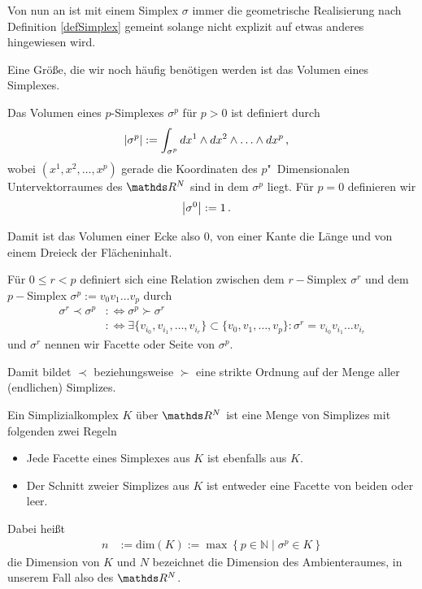     Von nun an ist mit einem Simplex \( \sigma \) immer die geometrische Realisierung nach Definition \ref{defSimplex} gemeint solange nicht explizit auf
    etwas anderes hingewiesen wird.
    
    Eine Größe, die wir noch häufig benötigen werden ist das Volumen eines Simplexes.
    \begin{definition}
      Das Volumen eines \( p \)-Simplexes \( \sigma^{p} \) für \( p > 0 \) ist definiert durch
      \begin{align}
        \left| \sigma^{p} \right| &:= \int_{\sigma^{p}} dx^{1}\wedge dx^{2} \wedge \ldots \wedge dx^{p}\,\text{,}
      \end{align}
      wobei \( \left( x^{1}, x^{2}, \ldots, x^{p} \right) \) gerade die Koordinaten des \( p \)"~Dimensionalen Untervektorraumes des
      \( \R^{N} \) sind in dem \( \sigma^{p} \) liegt.
      Für \( p=0  \) definieren wir
      \begin{align}
        \left| \sigma^{0} \right| &:= 1 \,\text{.}
      \end{align}
    \end{definition}
    Damit ist das Volumen einer Ecke also 0, von einer Kante die Länge und von einem Dreieck der Flächeninhalt.


    \begin{definition}
      Für \( 0 \le r < p \) definiert sich eine Relation zwischen dem \( r- \)Simplex \(\sigma^{r}\) und dem \( p- \)Simplex \( \sigma^{p}:= v_{0} v_{1} \ldots v_{p} \) durch
      \begin{align}
        \sigma^{r} \prec \sigma^{p} &:\Leftrightarrow \sigma^{p} \succ \sigma^{r} \\
                                    &:\Leftrightarrow \exists \{ v_{i_{0}}, v_{i_{1}}, \ldots, v_{i_{r}} \} \subset \{ v_{0}, v_{1}, \ldots, v_{p}\} : \sigma^{r} = v_{i_{0}} v_{i_{1}} \ldots v_{i_{r}}
      \end{align}
      und \( \sigma^{r} \) nennen wir Facette oder Seite von \( \sigma^{p} \).
    \end{definition}
    
    Damit bildet \( \prec \) beziehungsweise \( \succ \) eine strikte Ordnung auf der Menge aller (endlichen) Simplizes.
    
    \begin{definition}
      Ein Simplizialkomplex \( K \) über \( \R^{N} \) ist eine Menge von Simplizes mit folgenden zwei Regeln
      \begin{itemize}
        \item Jede Facette eines Simplexes aus \( K \) ist ebenfalls aus \( K \).
        \item Der Schnitt zweier Simplizes aus \( K \) ist entweder eine Facette von beiden oder leer.
      \end{itemize}
      Dabei heißt
      \begin{align}
        n &:= \text{dim}(K) := \max\left\{ p \in \mathds{N} \middle| \sigma^{p} \in K \right\}
      \end{align}
      die Dimension von \( K \) und \( N \) bezeichnet die Dimension des Ambienteraumes, in unserem Fall also des \( \R^{N} \).
    \end{definition}

